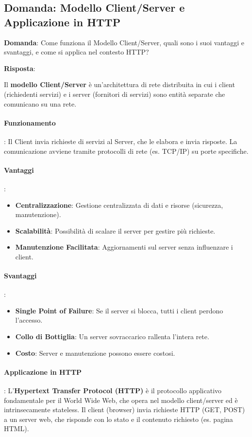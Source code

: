 
\subsection*{Domanda: Modello Client/Server e Applicazione in HTTP}

\textbf{Domanda}: Come funziona il Modello Client/Server, quali sono i suoi vantaggi e svantaggi, e come si applica nel contesto HTTP?

\textbf{Risposta}:

Il \textbf{modello Client/Server} è un'architettura di rete distribuita in cui i client (richiedenti servizi) e i server (fornitori di servizi) sono entità separate che comunicano su una rete.
\paragraph{Funzionamento}: Il Client invia richieste di servizi al Server, che le elabora e invia risposte. La comunicazione avviene tramite protocolli di rete (es. TCP/IP) su porte specifiche.
\paragraph{Vantaggi}:
\begin{itemize}
    \item \textbf{Centralizzazione}: Gestione centralizzata di dati e risorse (sicurezza, manutenzione).
    \item \textbf{Scalabilità}: Possibilità di scalare il server per gestire più richieste.
    \item \textbf{Manutenzione Facilitata}: Aggiornamenti sul server senza influenzare i client.
\end{itemize}
\paragraph{Svantaggi}:
\begin{itemize}
    \item \textbf{Single Point of Failure}: Se il server si blocca, tutti i client perdono l'accesso.
    \item \textbf{Collo di Bottiglia}: Un server sovraccarico rallenta l'intera rete.
    \item \textbf{Costo}: Server e manutenzione possono essere costosi.
\end{itemize}
\paragraph{Applicazione in HTTP}: L'\textbf{Hypertext Transfer Protocol (HTTP)} è il protocollo applicativo fondamentale per il World Wide Web, che opera nel modello client/server ed è intrinsecamente stateless. Il client (browser) invia richieste HTTP (GET, POST) a un server web, che risponde con lo stato e il contenuto richiesto (es. pagina HTML).